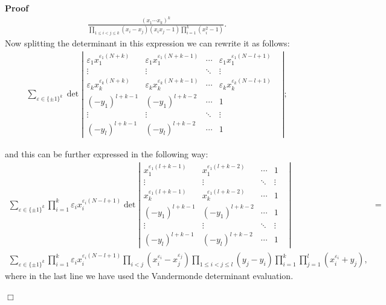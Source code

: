 \documentclass[11pt]{amsart}
\renewenvironment{proof}{
\noindent\textbf{Proof}\ }{\hspace*{\fill}
\begin{math}\Box\end{math}\medskip}
\begin{document}
\begin{proof}
\begin{equation*}
\begin{aligned}
    \frac{( x_1 \cdots x_k )^k}{\prod_{1 \leqslant i < j \leqslant k} ( x_i -
    x_j ) ( x_i x_j - 1 ) \prod_{i = 1}^k ( x_i^2 - 1 )} .
\end{aligned}
  \end{equation*}
  Now splitting the determinant in this expression we can rewrite it as
  follows:
  \begin{eqnarray*}
    \sum_{\varepsilon \in \{ \pm 1 \}^k} \det \left| \begin{array}{ccccc}
      \varepsilon_1 x_1^{\varepsilon_1 ( N+k )} & \varepsilon_1
      x_1^{\varepsilon_1 (N+k-1 )} & \cdots & \varepsilon_1
      x_1^{\varepsilon_1 ( N-l+1 )} & \\
      \vdots & \vdots & \ddots & \vdots & \\
      \varepsilon_k x_k^{\varepsilon_k ( N+k )} & \varepsilon_k
      x_k^{\varepsilon_k ( N+k-1 )} & \cdots & \varepsilon_k
      x_k^{\varepsilon_k ( N -l+1)} & \\
 ( - y_1 )^{l + k - 1} & ( - y_1 )^{l + k - 2}& \cdots &1 & \\
      \vdots & \vdots & \ddots & \vdots & \\
      ( - y_l )^{l + k - 1} & ( - y_l )^{l + k - 2}& \cdots &1 &
    \end{array} \right|;
\end{eqnarray*}

and this can be further expressed in the following way:
\begin{eqnarray*}
    \sum_{\varepsilon \in \{ \pm 1 \}^k} \prod_{i = 1}^k \varepsilon_i
    x_i^{\varepsilon_i ( N - l + 1 )} \det \left| \begin{array}{ccccc}
      x_1^{\varepsilon_1 ( l + k - 1 )} & x_1^{\varepsilon_1 ( l + k - 2 )} & \cdots &
      1 &
      \\
      \vdots & \vdots & \ddots & \vdots & \\
x_k^{\varepsilon_1 ( l + k - 1 )} & x_k^{\varepsilon_1 ( l + k - 2
)} & \cdots &
      1 &
      \\
       ( - y_1 )^{l + k - 1} & ( - y_1 )^{l + k - 2}& \cdots &1 & \\
      \vdots & \vdots & \ddots & \vdots & \\
      ( - y_l )^{l + k - 1} & ( - y_l )^{l + k - 2}& \cdots &1 &
    \end{array} \right| & = & \\
    \sum_{\varepsilon \in \{ \pm 1 \}^k} \prod_{i = 1}^k \varepsilon_i
    x_i^{\varepsilon_i ( N - l + 1 )} \prod_{i < j} ( x_i^{\varepsilon_i} -
    x_j^{\varepsilon_j} ) \prod_{1 \leqslant i < j \leqslant l} ( y_j - y_i )
    \prod_{i = 1}^k \prod_{j = 1}^l ( x_i^{\varepsilon_i} + y_j ), &  &
  \end{eqnarray*}
  where in the last line we have used the Vandermonde determinant evaluation.


\end{proof}
\end{document}
